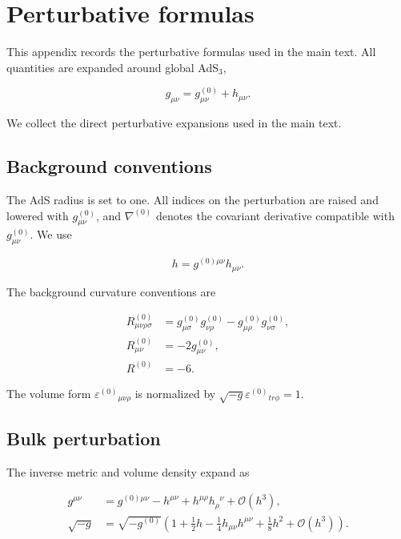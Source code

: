 \section{Perturbative formulas}\label{perturbative-formulas}

This appendix records the perturbative formulas used in the main text. All quantities are expanded around global AdS\(_3\),

\[
g_{\mu\nu}=g^{(0)}_{\mu\nu}+h_{\mu\nu}.
\]

We collect the direct perturbative expansions used in the main text.

\subsection{Background conventions}\label{background-conventions}

The AdS radius is set to one. All indices on the perturbation are raised and lowered with \(g^{(0)}_{\mu\nu}\), and \(\nabla^{(0)}\) denotes the covariant derivative compatible with \(g^{(0)}_{\mu\nu}\). We use

\[
h=g^{(0)\mu\nu}h_{\mu\nu}.
\]

The background curvature conventions are

\begin{align}
R^{(0)}_{\mu\nu\rho\sigma}&=g^{(0)}_{\mu\sigma}g^{(0)}_{\nu\rho}-g^{(0)}_{\mu\rho}g^{(0)}_{\nu\sigma},\\
R^{(0)}_{\mu\nu}&=-2g^{(0)}_{\mu\nu},\\
R^{(0)}&=-6.
\end{align}

The volume form \(\displaystyle{\varepsilon^{(0)}{} _{\mu \nu \rho}}\) is normalized by \(\displaystyle{\sqrt{ -g }\varepsilon ^{(0)}{}_{tr\phi}=1}\).

\subsection{Bulk perturbation}\label{bulk-perturbation}

The inverse metric and volume density expand as

\begin{align}
g^{\mu\nu}&=g^{(0)\mu\nu}-h^{\mu\nu}+h^{\mu\rho}h_{\rho}{}^{\nu}+\mathcal{O}(h^3),\\
\sqrt{-g}&=\sqrt{-g^{(0)}}\left(1+\frac{1}{2}h-\frac{1}{4}h_{\mu\nu}h^{\mu\nu}+\frac{1}{8}h^2+\mathcal{O}(h^3)\right).
\end{align}

